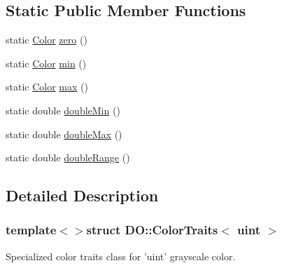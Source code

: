 \subsection*{Static Public Member Functions}
\begin{DoxyCompactItemize}
\item 
static \hyperlink{struct_d_o_1_1_color_traits_3_01uint_01_4_a8b2c4dc7fbdc5063366a0c52d63b0d0b}{Color} \hyperlink{struct_d_o_1_1_color_traits_3_01uint_01_4_a57b00f8db42515f404e06ab933932125}{zero} ()
\item 
static \hyperlink{struct_d_o_1_1_color_traits_3_01uint_01_4_a8b2c4dc7fbdc5063366a0c52d63b0d0b}{Color} \hyperlink{struct_d_o_1_1_color_traits_3_01uint_01_4_a1cd81f912af766f8004e4d5a82a7128b}{min} ()
\item 
static \hyperlink{struct_d_o_1_1_color_traits_3_01uint_01_4_a8b2c4dc7fbdc5063366a0c52d63b0d0b}{Color} \hyperlink{struct_d_o_1_1_color_traits_3_01uint_01_4_aded391d5e231096e135e08760c0fbeb6}{max} ()
\item 
static double \hyperlink{struct_d_o_1_1_color_traits_3_01uint_01_4_aa122aba748bfd453a27d2c30b368dbc3}{double\-Min} ()
\item 
static double \hyperlink{struct_d_o_1_1_color_traits_3_01uint_01_4_ab9fb6b1bb12e23b725453a69f6193c30}{double\-Max} ()
\item 
static double \hyperlink{struct_d_o_1_1_color_traits_3_01uint_01_4_aed64f95e634b8dac0ae5a0aed2b45740}{double\-Range} ()
\end{DoxyCompactItemize}


\subsection{Detailed Description}
\subsubsection*{template$<$$>$struct D\-O\-::\-Color\-Traits$<$ uint $>$}

Specialized color traits class for 'uint' grayscale color. 

